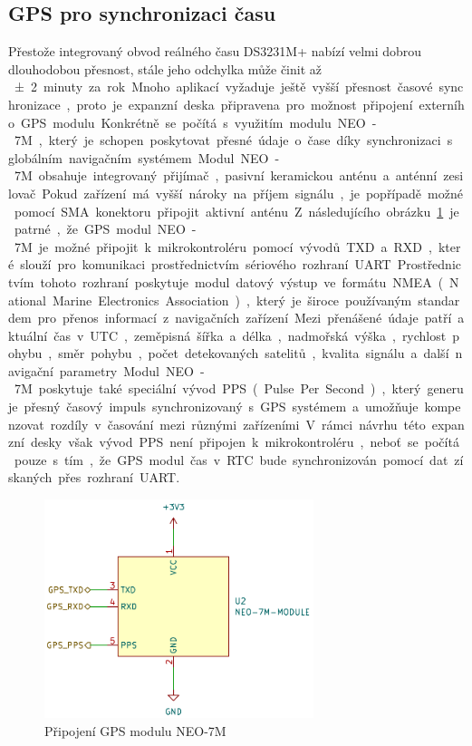 \subsection{GPS pro synchronizaci času}
Přestože integrovaný obvod reálného času DS3231M+ nabízí velmi dobrou dlouhodobou přesnost, stále jeho odchylka může činit až \SI{\pm2} minuty za rok. Mnoho aplikací vyžaduje ještě vyšší přesnost časové synchronizace, proto je expanzní deska připravena pro možnost připojení externího GPS modulu. Konkrétně se~počítá s využitím modulu NEO-7M, který je schopen poskytovat přesné údaje o~čase díky synchronizaci s globálním navigačním systémem.

Modul NEO-7M obsahuje integrovaný přijímač, pasivní keramickou anténu a~anténní zesilovač. Pokud zařízení má vyšší nároky na příjem signálu, je popřípadě možné pomocí SMA konektoru připojit aktivní anténu. Z následujícího obrázku~\ref{fig:neo-7m} je patrné, že GPS modul NEO-7M je možné připojit k~mikrokontroléru pomocí vývodů TXD a~RXD, které slouží pro komunikaci prostřednictvím sériového rozhraní UART. Prostřednictvím tohoto rozhraní poskytuje modul datový výstup ve~formátu NMEA (National Marine Electronics Association), který je široce používaným standardem pro přenos informací z~navigačních zařízení. Mezi přenášené údaje patří aktuální čas v~UTC, zeměpisná šířka a~délka, nadmořská výška, rychlost pohybu, směr pohybu, počet detekovaných satelitů, kvalita signálu a~další navigační parametry. Modul NEO-7M poskytuje také speciální vývod PPS (Pulse Per Second), který generuje přesný časový impuls synchronizovaný s GPS systémem a~umožňuje kompenzovat rozdíly v časování mezi různými zařízeními. V~rámci návrhu této expanzní desky však vývod PPS není připojen k~mikrokontroléru, neboť se~počítá pouze s tím, že GPS modul čas v RTC bude synchronizován pomocí dat získaných přes rozhraní UART.

\begin{figure}[h]
    \centering
    \includegraphics[width=0.70\textwidth]{obrazky-figures/neo-7m.pdf}
    
    \caption{Připojení GPS modulu NEO-7M}
    \label{fig:neo-7m}
\end{figure}

